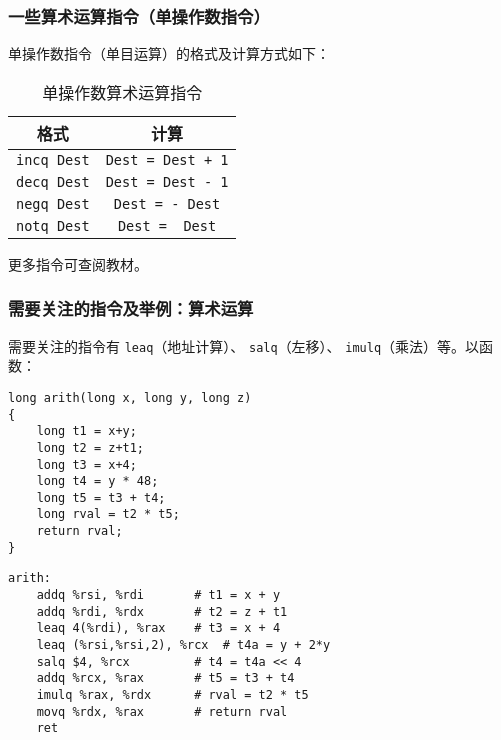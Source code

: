\subsubsection{一些算术运算指令（单操作数指令）}
单操作数指令（单目运算）的格式及计算方式如下：
\begin{table}[H]
    \captionsetup{skip=4pt}
    \centering
    \setlength{\arrayrulewidth}{1pt}
    \begin{tabular}{cc}
        \hline
        格式                          & 计算                                \\
        \hline
        \texttt{incq Dest} & \texttt{Dest = Dest + 1} \\
        \texttt{decq Dest} & \texttt{Dest = Dest - 1} \\
        \texttt{negq Dest} & \texttt{Dest = - Dest}   \\
        \texttt{notq Dest} & \texttt{Dest = ~Dest}    \\
        \hline
    \end{tabular}
    \caption{单操作数算术运算指令}
\end{table}
更多指令可查阅教材。
\subsubsection{需要关注的指令及举例：算术运算}
需要关注的指令有 \texttt{leaq}（地址计算）、 \texttt{salq}（左移）、 \texttt{imulq}（乘法）等。以函数：
\begin{multicols}{2}
    \begin{verbatim}
long arith(long x, long y, long z)
{
    long t1 = x+y;
    long t2 = z+t1;
    long t3 = x+4;
    long t4 = y * 48;
    long t5 = t3 + t4;
    long rval = t2 * t5;
    return rval;
}
\end{verbatim}
    \columnbreak
    \begin{verbatim}
arith:
    addq %rsi, %rdi       # t1 = x + y
    addq %rdi, %rdx       # t2 = z + t1
    leaq 4(%rdi), %rax    # t3 = x + 4
    leaq (%rsi,%rsi,2), %rcx  # t4a = y + 2*y
    salq $4, %rcx         # t4 = t4a << 4
    addq %rcx, %rax       # t5 = t3 + t4
    imulq %rax, %rdx      # rval = t2 * t5
    movq %rdx, %rax       # return rval
    ret
\end{verbatim}
\end{multicols}

